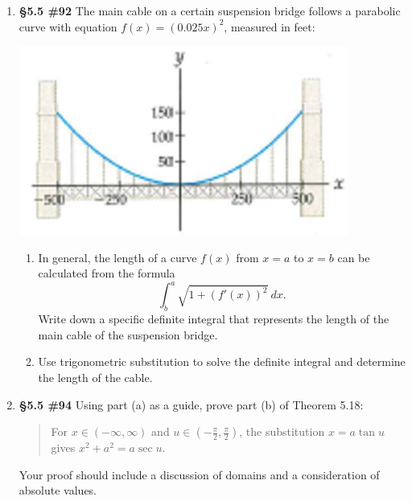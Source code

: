 \documentclass[%
]{article}
\begin{document}
\begin{enumerate}
\item {\bf \S5.5 \#92}  The main cable on a certain suspension bridge follows a parabolic curve with equation $f(x)=(0.025x)^2$, measured in feet:  
\begin{center}
\includegraphics[scale=0.75]{5-5_92TaalmanKohn}
\end{center}	
	\begin{enumerate}
	\item  In general, the length of a curve $f(x)$ from $x=a$ to $x=b$ can be calculated from the formula
	\[
	\int_b^a\sqrt{1+(f'(x))^2}\ dx.
	\]
	Write down a specific definite integral that represents the length of the main cable of the suspension bridge.
	\item Use trigonometric substitution to solve the definite integral and determine the length of the cable.
	\end{enumerate}

\item {\bf \S5.5 \#94} Using part (a) as a guide, prove part (b) of Theorem 5.18:
\begin{quote}
For $x\in (-\infty, \infty)$ and $u\in (-\frac{\pi}{2},\frac{\pi}{2})$, the substitution $x=a\tan u$ gives $x^2+a^2=a\sec u$. 
\end{quote}
Your proof should include a discussion of domains and a consideration of absolute values.

\end{enumerate}
\end{document}
